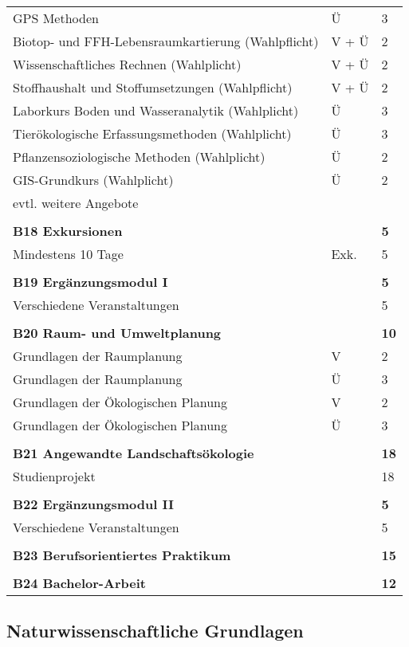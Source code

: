 \begin{longtable}{p{} p{} p{}}
GPS Methoden & Ü & 3\\
Biotop- und FFH-Lebensraumkartierung (Wahlpflicht) & V + Ü & 2\\
Wissenschaftliches Rechnen (Wahlplicht) & V + Ü & 2\\
Stoffhaushalt und Stoffumsetzungen (Wahlpflicht) & V + Ü & 2\\
Laborkurs Boden und Wasseranalytik (Wahlplicht) & Ü & 3\\
Tierökologische Erfassungsmethoden (Wahlplicht) & Ü & 3\\
Pflanzensoziologische Methoden (Wahlplicht) & Ü & 2\\
GIS-Grundkurs (Wahlplicht)  & Ü & 2\\
evtl. weitere Angebote\\
&&\\
\textbf{B18 Exkursionen}&&\textbf{5}\\
Mindestens 10 Tage & Exk. & 5\\
&&\\
\textbf{B19 Ergänzungsmodul I} && \textbf{5}\\
Verschiedene Veranstaltungen & & 5\\
&&\\
\textbf{B20 Raum- und Umweltplanung}&&\textbf{10}\\
Grundlagen der Raumplanung & V & 2\\
Grundlagen der Raumplanung & Ü & 3\\
Grundlagen der Ökologischen Planung & V & 2\\
Grundlagen der Ökologischen Planung & Ü & 3\\
&&\\
\textbf{B21 Angewandte Landschaftsökologie} && \textbf{18}\\
Studienprojekt & & 18\\
&&\\
\textbf{B22 Ergänzungsmodul II} && \textbf{5}\\
Verschiedene Veranstaltungen && 5\\
&&\\
\textbf{B23 Berufsorientiertes Praktikum} & & \textbf{15}\\
&&\\
\textbf{B24 Bachelor-Arbeit} && \textbf{12}\\
\end{longtable}

\subsection*{Naturwissenschaftliche Grundlagen}
